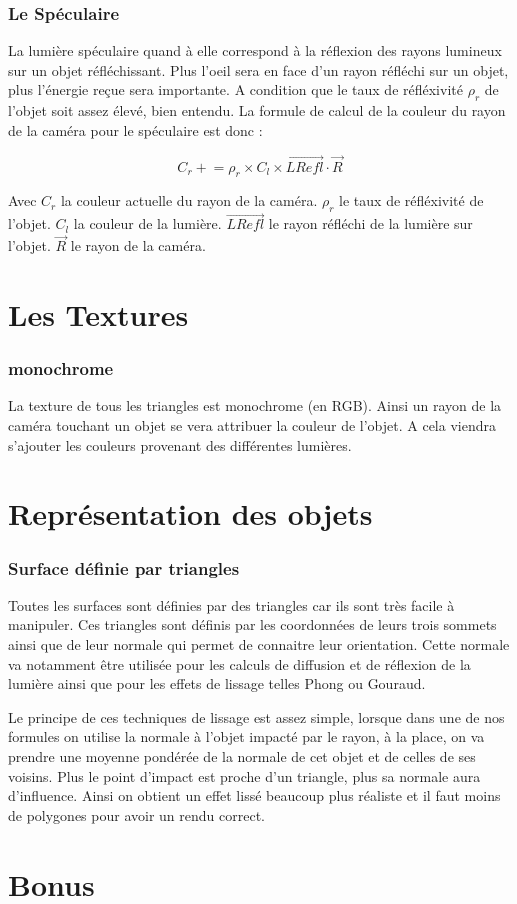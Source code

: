 \documentclass[fontsize=10pt, twoside=no]{scrartcl} %
\begin{document}
    \section{Le Spéculaire}

La lumière spéculaire quand à elle correspond à la réflexion des rayons lumineux sur un objet réfléchissant. Plus l'oeil
sera en face d'un rayon réfléchi sur un objet, plus l'énergie reçue sera importante. A condition que le taux de
réfléxivité $\rho_{r}$ de l'objet soit assez élevé, bien entendu. La formule de calcul de la couleur du rayon de la caméra
pour le spéculaire est donc :

$$C_{r} \mathrel{+}= \rho _{r} \times C_{l} \times \vec{LRefl} \cdot \vec{R}$$

Avec $C_{r}$ la couleur actuelle du rayon de la caméra. $\rho_{r}$ le taux de réfléxivité de l'objet. $C_{l}$ la couleur
de la lumière. $\vec{LRefl}$ le rayon réfléchi de la lumière sur l'objet. $\vec{R}$ le rayon de la caméra.

\part{Les Textures}

    \section{monochrome}

La texture de tous les triangles est monochrome (en RGB). Ainsi un rayon de la caméra touchant un objet se vera
attribuer la couleur de l'objet. A cela viendra s'ajouter les couleurs provenant des différentes lumières.

\part{Représentation des objets}

    \section{Surface définie par triangles}

Toutes les surfaces sont définies par des triangles car ils sont très facile à manipuler. Ces triangles sont définis par
les coordonnées de leurs trois sommets ainsi que de leur normale qui permet de connaitre leur orientation. Cette normale
va notamment être utilisée pour les calculs de diffusion et de réflexion de la lumière ainsi que pour les effets de
lissage telles Phong ou Gouraud.

Le principe de ces techniques de lissage est assez simple, lorsque dans une de nos formules on utilise la normale à
l'objet impacté par le rayon, à la place, on va prendre une moyenne pondérée de la normale de cet objet et de celles de
ses voisins. Plus le point d'impact est proche d'un triangle, plus sa normale aura d'influence. Ainsi on obtient un
effet lissé beaucoup plus réaliste et il faut moins de polygones pour avoir un rendu correct.
    
\part{Bonus}
\end{document}
